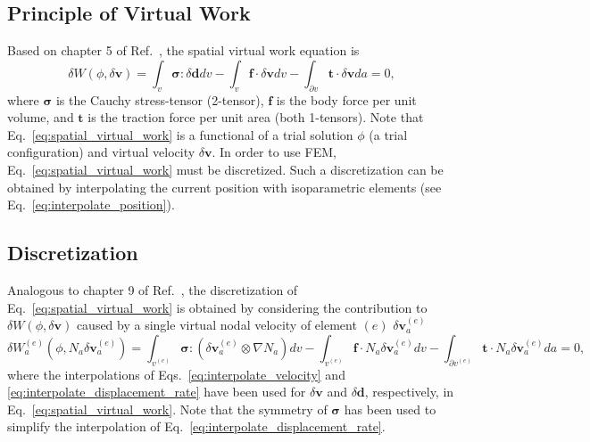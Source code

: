 \documentclass[12pt,aps,pre]{revtex4}
\begin{document}
\subsection{Principle of Virtual Work} 

Based on chapter 5 of Ref.\ , the spatial virtual work equation is
%
\begin{equation}
\delta W(\phi,\delta \pmb{v}) = \int_v \pmb{\sigma}:\delta \pmb{d} dv - \int_v \pmb{f} \cdot \delta\pmb{v}dv - \int_{\partial v} \pmb{t} \cdot \delta \pmb{v} da = 0,
\label{eq:spatial_virtual_work}
\end{equation}
%
where $\pmb{\sigma}$ is the Cauchy stress-tensor (2-tensor), $\pmb{f}$ is the body force per unit volume, and $\pmb{t}$ is the traction force per unit area (both 1-tensors). Note that Eq.\ \eqref{eq:spatial_virtual_work} is a functional of a trial solution $\phi$ (a trial configuration) and virtual velocity $\delta \pmb{v}$. In order to use FEM, Eq.\ \eqref{eq:spatial_virtual_work} must be discretized. Such a discretization can be obtained by interpolating the current position with isoparametric elements (see Eq.\ \eqref{eq:interpolate_position}).

\subsection{Discretization}

Analogous to chapter 9 of Ref.\ , the discretization of Eq.\ \eqref{eq:spatial_virtual_work} is obtained by considering the contribution to $\delta W(\phi,\delta \pmb{v})$ caused by a single virtual nodal velocity of element $(e)$ $\delta \pmb{v}^{(e)}_a$  
%
\begin{equation}
\delta W^{(e)}_a(\phi,N_a\delta\pmb{v}^{(e)}_a) = \int_{v^{(e)}} \pmb{\sigma}:(\delta \pmb{v}^{(e)}_a \otimes \nabla N_a) dv - \int_{v^{(e)}} \pmb{f} \cdot N_a \delta\pmb{v}^{(e)}_a dv - \int_{\partial v^{(e)}} \pmb{t} \cdot N_a \delta\pmb{v}^{(e)}_a da = 0,
\label{eq:discretized_virtual_work}
\end{equation}
%
where the interpolations of Eqs.\ \eqref{eq:interpolate_velocity} and \eqref{eq:interpolate_displacement_rate} have been used for $\delta \pmb{v}$ and $\delta \pmb{d}$, respectively, in Eq.\ \eqref{eq:spatial_virtual_work}. Note that the symmetry of $\pmb{\sigma}$ has been used to simplify the interpolation of Eq.\ \eqref{eq:interpolate_displacement_rate}. 
\end{document}
